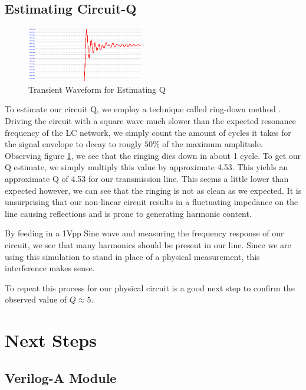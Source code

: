 \documentclass[journal]{IEEEtran} \usepackage[english]{babel}
\begin{document}
\subsection{Estimating Circuit-Q}

\begin{figure}[htb]
\centering
\includegraphics[width=0.45\textwidth]{EstimatingQ.png}
\caption{Transient Waveform for Estimating Q
}\label{fig:EstimQ}
\end{figure}


To estimate our circuit Q, we employ a technique called ring-down method
\cite{giangrandi}. Driving the circuit with a square wave much slower than the
expected resonance frequency of the LC network, we simply count the amount of
cycles it takes for the signal envelope to decay to rougly $50\%$ of the maximum
amplitude. Observing figure \ref{fig:EstimQ}, we see that the ringing dies
down in about 1 cycle. To get our Q estimate, we simply multiply this value by
approximate 4.53. This yields an approximate Q of 4.53 for our transmission
line. This seems a little lower than expected however, we can see that the
ringing is not as clean as we expected.
It is unsurprising that our non-linear circuit results in a fluctuating
impedance on the line causing reflections and is prone to generating harmonic
content.

By feeding in a 1Vpp Sine wave and measuring the frequency response of our
circuit, we see that many harmonics should be present in our line. Since we are
using this simulation to stand in place of a physical measurement, this
interference makes sense.

To repeat this process for our physical circuit is a good next step to confirm
the observed value of $Q \approx 5$.

\section{Next Steps}\label{sec:NextSteps}

\subsection{Verilog-A Module}
\end{document}
